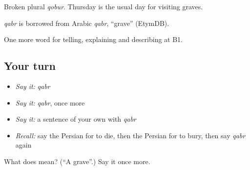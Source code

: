 Broken plural \emph{qobur}. Thursday is the usual day for visiting graves.

\begin{cousinweb}
\emph{qabr} is borrowed from Arabic \emph{qabr}, \textquotedblleft{}grave\textquotedblright{} (EtymDB).
\end{cousinweb}

\begin{grammarlens}[title={What you've built}]
One more word for telling, explaining and describing at B1.
\end{grammarlens}

\subsection*{Your turn}
\begin{itemize}
\raggedright
  \item \emph{Say it:} \emph{qabr}
  \item \emph{Say it:} \emph{qabr}, once more
  \item \emph{Say it:} a sentence of your own with \emph{qabr}
  \item \emph{Recall:} say the Persian for to die, then the Persian for to bury, then say \emph{qabr} again
\end{itemize}

\begin{tcolorbox}[breakable,colback=teal!4,colframe=teal!35!black,title={Before you move on}]
What does  mean? (\textquotedblleft{}A grave\textquotedblright{}.) Say it once more.
\end{tcolorbox}
